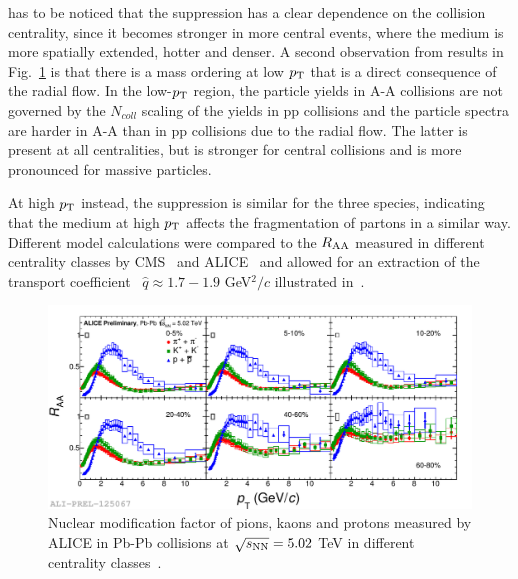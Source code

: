  has to be noticed that the suppression has a clear dependence on the 
 collision centrality, since it becomes stronger in more central events, 
 where the medium is more spatially extended, hotter and denser. 
 A second observation from 
  results in Fig.~\ref{fig:PiKPRaa5TeV} is that there is a mass ordering at 
  low $p_{\rm T}$ that is a direct consequence of the radial flow. In the low-$p_{\rm T}$
  region, the particle yields in A-A collisions are not governed by the $N_{coll}$ scaling 
  of the yields in pp collisions and the particle spectra are harder in A-A than in pp collisions due to the radial flow. 
  The latter is present at all centralities, but is stronger for central collisions and
  is more pronounced for massive particles.
  
  At high $p_{\rm T}$
   instead, the suppression is similar for the three species, indicating
    that the medium at high $p_{\rm T}$ affects the fragmentation of partons in a similar 
    way. Different model calculations were compared to the $R_{\rm AA}$ 
    measured in different centrality classes by CMS~\cite{CMS:2012aa} 
    and ALICE~\cite{Abelev:2012hxa} and allowed for an extraction of 
    the transport coefficient~\cite{Baier:1996sk} $\hat{q} \approx 1.7-1.9$ 
    GeV$^2/c$ illustrated in~\cite{Burke:2013yra,Liu:2015vna}. 
\begin{figure}[!ht]
  \centering
  \includegraphics[width=15cm]{FigCap1/KPiPRAA5TeV.pdf}
  \caption{Nuclear modification factor of pions, kaons and protons measured by ALICE in Pb-Pb collisions at $\sqrt{s_{\rm NN}} = 5.02$ TeV in different centrality classes~\cite{Jacazio:2017dvy}.}
  \label{fig:PiKPRaa5TeV}
\end{figure}

